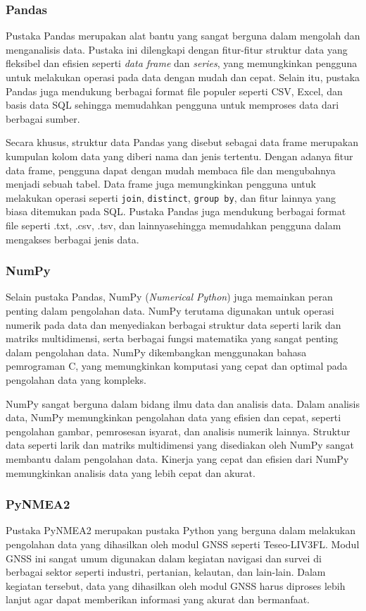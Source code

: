 \subsubsection{Pandas}
Pustaka Pandas merupakan alat bantu yang sangat berguna dalam mengolah dan menganalisis data. Pustaka ini dilengkapi dengan fitur-fitur struktur data yang fleksibel dan efisien seperti \textit{data frame} dan \textit{series}, yang memungkinkan pengguna untuk melakukan operasi pada data dengan mudah dan cepat. Selain itu, pustaka Pandas juga mendukung berbagai format file populer seperti CSV, Excel, dan basis data SQL sehingga memudahkan pengguna untuk memproses data dari berbagai sumber.

Secara khusus, struktur data Pandas yang disebut sebagai data frame merupakan kumpulan kolom data yang diberi nama dan jenis tertentu. Dengan adanya fitur data frame, pengguna dapat dengan mudah membaca file dan mengubahnya menjadi sebuah tabel. Data frame juga memungkinkan pengguna untuk melakukan operasi seperti \texttt{join}, \texttt{distinct}, \texttt{group by}, dan fitur lainnya yang biasa ditemukan pada SQL. Pustaka Pandas juga mendukung berbagai format file seperti .txt, .csv, .tsv, dan lainnyasehingga memudahkan pengguna dalam mengakses berbagai jenis data.

\subsubsection{NumPy}
Selain pustaka Pandas, NumPy (\textit{Numerical Python}) juga memainkan peran penting dalam pengolahan data. NumPy terutama digunakan untuk operasi numerik pada data dan menyediakan berbagai struktur data seperti larik dan matriks multidimensi, serta berbagai fungsi matematika yang sangat penting dalam pengolahan data. NumPy dikembangkan menggunakan bahasa pemrograman C, yang memungkinkan komputasi yang cepat dan optimal pada pengolahan data yang kompleks.

NumPy sangat berguna dalam bidang ilmu data dan analisis data. Dalam analisis data, NumPy memungkinkan pengolahan data yang efisien dan cepat, seperti pengolahan gambar, pemrosesan isyarat, dan analisis numerik lainnya. Struktur data seperti larik dan matriks multidimensi yang disediakan oleh NumPy sangat membantu dalam pengolahan data. Kinerja yang cepat dan efisien dari NumPy memungkinkan analisis data yang lebih cepat dan akurat.

\subsubsection{PyNMEA2}
Pustaka PyNMEA2 merupakan pustaka Python yang berguna dalam melakukan pengolahan data yang dihasilkan oleh modul GNSS seperti Teseo-LIV3FL. Modul GNSS ini sangat umum digunakan dalam kegiatan navigasi dan survei di berbagai sektor seperti industri, pertanian, kelautan, dan lain-lain. Dalam kegiatan tersebut, data yang dihasilkan oleh modul GNSS harus diproses lebih lanjut agar dapat memberikan informasi yang akurat dan bermanfaat.

